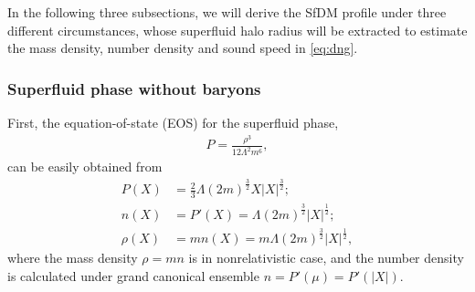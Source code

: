 \documentclass[aps,prd,twocolumn,10pt,groupedaddress]{revtex4-1}
\begin{document}
In the following three subsections, we will derive the SfDM profile under three different circumstances, whose superfluid halo radius will be extracted to estimate the mass density, number density and sound speed in \eqref{eq:dng}.

\subsubsection{Superfluid phase without baryons} \label{subsubsec:DMonly}

First, the equation-of-state (EOS) for the superfluid phase,
\begin{align}\label{eq:EOS1}
P=\frac{\rho^3}{12\Lambda^2m^6},
\end{align}
can be easily obtained from
\begin{align}\label{eq:superfluid}
P(X)&=\frac23\Lambda(2m)^\frac32X|X|^\frac32;\\
n(X)&=P'(X)=\Lambda(2m)^\frac32|X|^\frac12;\\
\rho(X)&=mn(X)=m\Lambda(2m)^\frac32|X|^\frac12,
\end{align}
where the mass density $\rho=mn$ is in nonrelativistic case, and the number density is calculated under grand canonical ensemble $n=P'(\mu)=P'(|X|)$.
\end{document}
